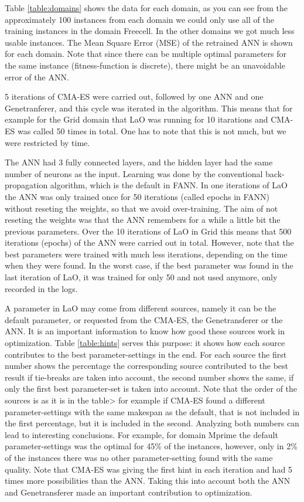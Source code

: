\documentclass{acm_proc_article-sp}
\begin{document}
Table \ref{table:domains} shows the data for each domain, as you can see from the approximately 100 instances from each domain we could only use all of the training instances in the domain Freecell. In the other domains we got much less usable instances. The Mean Square Error (MSE) of the retrained ANN is shown for each domain. Note that since there can be multiple optimal parameters for the same instance (fitness-function is discrete), there might be an unavoidable error of the ANN.

5 iterations of CMA-ES were carried out, followed by one ANN and one Genetranferer, and this cycle was iterated in the algorithm. This means that for example for the Grid domain that LaO was running for 10 itarations and CMA-ES was called 50 times in total. One has to note that this is not much, but we were restricted by time.

The ANN had 3 fully connected layers, and the hidden layer had the same number of neurons as the input. Learning was done by the conventional back-propagation algorithm, which is the default in FANN. In one iterations of LaO the ANN was only trained once for 50 iterations (called epochs in FANN) without reseting the weights, so that we avoid over-training. The aim of not reseting the weights was that the ANN remembers for a while a little bit the previous parameters. Over the 10 iterations of LaO in Grid this means that 500 iterations (epochs) of the ANN were carried out in total. However, note that the best parameters were trained with much less iterations, depending on the time when they were found. In the worst case, if the best parameter was found in the last iteration of LaO, it was trained for only 50 and not used anymore, only recorded in the logs. 

A parameter in LaO may come from different sources, namely it can be the default parameter, or requested from the CMA-ES, the Genetransferer or the ANN. It is an important information to know how good these sources work in optimization. Table \ref{table:hints} serves this purpose: it shows how each source contributes to the best parameter-settings in the end. For each source the first number shows the percentage the corresponding source contributed to the best result if tie-breaks are taken into account, the second number shows the same, if only the first best parameter-set is taken into account. Note that the order of the sources is as it is in the table> for example if CMA-ES found a different parameter-settings with the same makespan as the default, that is not included in the first percentage, but it is included in the second. Analyzing both numbers can lead to interesting conclusions. For example, for domain Mprime the default parameter-settings was the optimal for 45\% of the instances, however, only in 2\% of the instances there was no other parameter-setting found with the same quality. Note that CMA-ES was giving the first hint in each iteration and had 5 times more possibilities than the ANN. Taking this into account both the ANN and Genetransferer made an important contribution to optimization.
\end{document}
